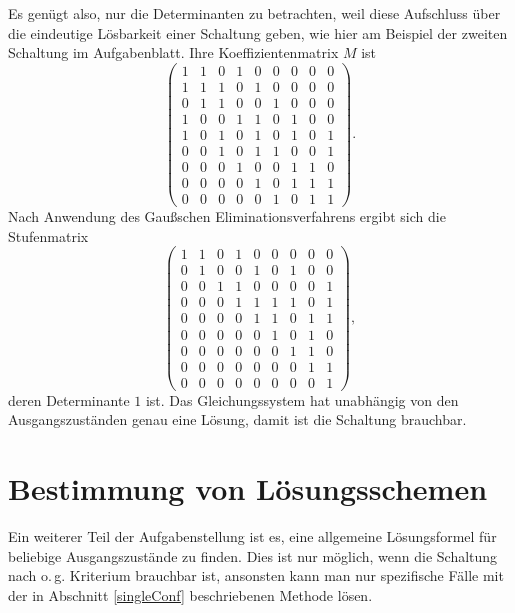\documentclass{scrartcl}
\begin{document}
Es genügt also, nur die Determinanten zu betrachten, weil diese Aufschluss über
die eindeutige Lösbarkeit einer Schaltung geben, wie hier am Beispiel der
zweiten Schaltung im Aufgabenblatt. Ihre Koeffizientenmatrix $M$ ist
\begin{equation}
\begin{pmatrix}
  1&1&0&1&0&0&0&0&0\\
  1&1&1&0&1&0&0&0&0\\
  0&1&1&0&0&1&0&0&0\\
  1&0&0&1&1&0&1&0&0\\
  1&0&1&0&1&0&1&0&1\\
  0&0&1&0&1&1&0&0&1\\
  0&0&0&1&0&0&1&1&0\\
  0&0&0&0&1&0&1&1&1\\
  0&0&0&0&0&1&0&1&1
\end{pmatrix}.
\end{equation}
Nach Anwendung des Gaußschen Eliminationsverfahrens ergibt sich die
Stufenmatrix
\begin{equation}
\begin{pmatrix}
  1&1&0&1&0&0&0&0&0\\
  0&1&0&0&1&0&1&0&0\\
  0&0&1&1&0&0&0&0&1\\
  0&0&0&1&1&1&1&0&1\\
  0&0&0&0&1&1&0&1&1\\
  0&0&0&0&0&1&0&1&0\\
  0&0&0&0&0&0&1&1&0\\
  0&0&0&0&0&0&0&1&1\\
  0&0&0&0&0&0&0&0&1
\end{pmatrix},
\end{equation}
deren Determinante $1$ ist. Das Gleichungssystem hat unabhängig von den
Ausgangszuständen genau eine Lösung, damit ist die Schaltung brauchbar.

\section{Bestimmung von Lösungsschemen}
Ein weiterer Teil der Aufgabenstellung ist es, eine allgemeine Lösungsformel
für beliebige Ausgangszustände zu finden. Dies ist nur möglich, wenn die
Schaltung nach o.\,g. Kriterium brauchbar ist, ansonsten kann man nur
spezifische Fälle mit der in Abschnitt \ref{singleConf} beschriebenen Methode
lösen.
\end{document}
